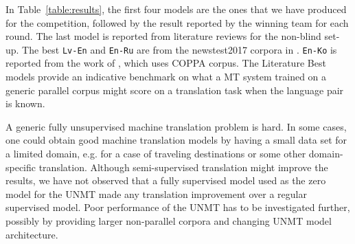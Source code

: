 \documentclass[]{article}
\begin{document}
In Table~\ref{table:results}, the first four models are the ones that we have produced for the competition, followed by the result reported by the winning team for each round.
The last model is reported from literature reviews for the non-blind set-up.
The best {\tt Lv-En} and  {\tt En-Ru} are from the newstest2017 corpora in \cite{bojar2017findings}.
{\tt En-Ko} is reported from the work of \cite{junczys2016coppa}, which uses COPPA corpus.
The Literature Best models provide an indicative benchmark on what a \ac{MT} system trained on a generic parallel corpus might score on a translation task when the language pair is known.

A generic fully unsupervised machine translation problem is hard.
In some cases, one could obtain good machine translation models by having a small data set for a limited domain, e.g. for a case of traveling destinations or some other domain-specific translation.
Although semi-supervised translation might improve the results, we have not observed that a fully supervised model used as the zero model for the \ac{UNMT} made any translation improvement over a regular supervised model.
Poor performance of the \ac{UNMT} has to be investigated further, possibly by providing larger non-parallel corpora and changing \ac{UNMT} model architecture.

\small



\end{document}
